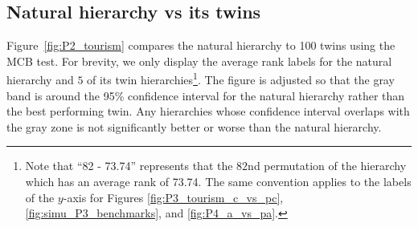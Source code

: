 \documentclass[a4paper,review,12pt,authoryear]{elsarticle}
\begin{document}


\subsection{Natural hierarchy vs its twins}

\label{subsec:n_vs_pn}


Figure~\ref{fig:P2_tourism} compares the natural hierarchy to 100 twins using the MCB test. For brevity, we only display the average rank labels for the natural hierarchy and $5$ of its twin hierarchies\footnote{Note that ``82 - 73.74'' represents that the $82$nd permutation of the hierarchy which has an average rank of 73.74. The same convention applies to the labels of the $y$-axis for Figures \ref{fig:P3_tourism_c_vs_pc},  \ref{fig:simu_P3_benchmarks}, and \ref{fig:P4_a_vs_pa}.}. The figure is adjusted so that the gray band is around the 95\% confidence interval for the natural hierarchy rather than the best performing twin. Any hierarchies whose confidence interval overlaps with the gray zone is not significantly better or worse than the natural hierarchy. 
\end{document}
